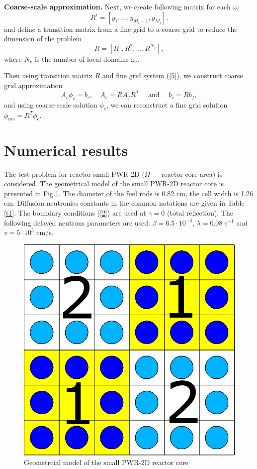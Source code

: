 \documentclass[runningheads]{llncs}
\begin{document}
\textbf{Coarse-scale approximation. }
Next, we create following  matrix for each $\omega_i$
\[
R^i = \left[ y_1, \ldots, y_{M_i-1},  y_{M_i} \right].
\]
and  define a transition matrix from a fine grid to a coarse grid to reduce the dimension of the problem
\[
R = [ R^1, R^2, ..., R^{N_v} ],
\]
where $N_v$ is the number of local domains $\omega_i$.

Then using transition matrix $R$ and fine grid system (\ref{5}), we construct coarse grid approximation
\begin{equation}\label{9}
A_c \phi_c = b_c, \quad 
A_c = R A_f R^T 
\quad \text{ and } \quad 
b_c = R b_f,
\end{equation}  
and using coarse-scale solution $\phi_c$, we can  reconstruct a fine grid solution $\phi_{ms} = R^T \phi_c$.

\section{Numerical results}
The test problem for reactor small PWR-2D ($\Omega$ --- reactor core area) is considered. 
The geometrical model of the small PWR-2D reactor core is presented in Fig.\ref{p3}. 
The diameter of the fuel rods is 0.82 cm, the cell width is 1.26 cm.
Diffusion neutronics constants in the common notations are given in Table \ref{t1}. 
The boundary conditions (\ref{2}) are used at $\gamma = 0$ (total reflection).
The following delayed neutrons parameters are used: $\beta = 6.5 \cdot 10^{-3}$, $\lambda = 0.08$ s$^{-1}$ and $v = 5 \cdot 10^5$ cm/s.

\begin{figure}[h]
  \begin{center}
    \includegraphics[width=0.4\linewidth] {smallpwr.png}
	\caption{Geometrcial model of the small PWR-2D reactor core}
	\label{p3}
  \end{center}
\end{figure} 
\end{document}
